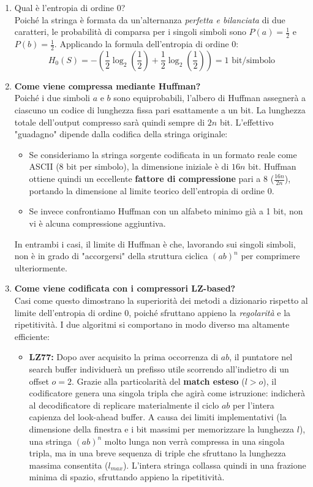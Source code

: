 \begin{enumerate}
    \item Qual è l'entropia di ordine 0?\\
    Poiché la stringa è formata da un'alternanza \textit{perfetta e bilanciata} di due caratteri, le probabilità di comparsa per i singoli simboli sono $P(a) = \frac{1}{2}$ e $P(b) = \frac{1}{2}$. Applicando la formula dell'entropia di ordine 0:
    \[ H_0(S) = - \left( \frac{1}{2}\log_2\left(\frac{1}{2}\right) + \frac{1}{2}\log_2\left(\frac{1}{2}\right) \right) = 1 \text{ bit/simbolo} \]
        
    \item \textbf{Come viene compressa mediante Huffman?}\\
    Poiché i due simboli $a$ e $b$ sono equiprobabili, l'albero di Huffman assegnerà a ciascuno un codice di lunghezza fissa pari esattamente a un bit. La lunghezza totale dell'output compresso sarà quindi sempre di $2n$ bit. 
    L'effettivo "guadagno" dipende dalla codifica della stringa originale:
    \begin{itemize}
        \item Se consideriamo la stringa sorgente codificata in un formato reale come ASCII ($8\text{ bit}$ per simbolo), la dimensione iniziale è di $16n\text{ bit}$. Huffman ottiene quindi un eccellente \textbf{fattore di compressione} pari a $8$ ($\frac{16n}{2n}$), portando la dimensione al limite teorico dell'entropia di ordine 0.
        \item Se invece confrontiamo Huffman con un alfabeto minimo già a 1 bit, non vi è alcuna compressione aggiuntiva. 
    \end{itemize}
    In entrambi i casi, il limite di Huffman è che, lavorando sui singoli simboli, non è in grado di "accorgersi" della struttura ciclica $(ab)^n$ per comprimere ulteriormente.
    
\item \textbf{Come viene codificata con i compressori LZ-based?}\\
    Casi come questo dimostrano la superiorità dei metodi a dizionario rispetto al limite dell'entropia di ordine 0, poiché sfruttano appieno la \textit{regolarità} e la ripetitività. I due algoritmi si comportano in modo diverso ma altamente efficiente:
    \begin{itemize}
        \item \textbf{LZ77:} Dopo aver acquisito la prima occorrenza di $ab$, il puntatore nel search buffer individuerà un prefisso utile scorrendo all'indietro di un offset $o = 2$. Grazie alla particolarità del \textbf{match esteso} ($l > o$), il codificatore genera una singola tripla che agirà come istruzione: indicherà al decodificatore di replicare materialmente il ciclo $ab$ per l'intera capienza del look-ahead buffer. A causa dei limiti implementativi (la dimensione della finestra e i bit massimi per memorizzare la lunghezza $l$), una stringa $(ab)^n$ molto lunga non verrà compressa in una singola tripla, ma in una breve sequenza di triple che sfruttano la lunghezza massima consentita ($l_{max}$). L'intera stringa collassa quindi in una frazione minima di spazio, sfruttando appieno la ripetitività.
        

\end{itemize}
\end{enumerate}
